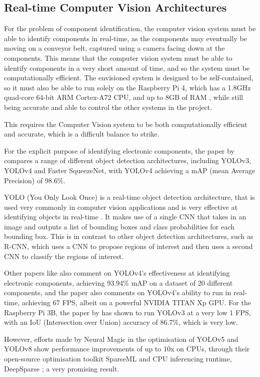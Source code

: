 \subsection{Real-time Computer Vision Architectures}
For the problem of component identification, the computer vision system must be able to identify components in real-time, as the components may eventually be moving on a conveyor belt, captured using
a camera facing down at the components. This means that the computer vision system must be able to identify components in a very short amount of time, and so the system must be computationally efficient.
The envisioned system is designed to be self-contained, so it must also be able to run solely on the Raspberry Pi 4, which has a 1.8GHz quad-core 64-bit ARM Cortex-A72 CPU, and up to 8GB of RAM \cite{pi4}, while still being
accurate and able to control the other systems in the project.

This requires the Computer Vision system to be both computationally efficient and accurate, which is a difficult balance to strike.

For the explicit purpose of identifying electronic components, the paper by \citet{s22239079} compares a range of different object detection architectures, including YOLOv3, YOLOv4 and Faster SqueezeNet, with YOLOv4 achieving a mAP (mean Average Precision) of 98.6\%.

YOLO (You Only Look Once) is a real-time object detection architecture, that is used very commonly in computer vision applications and is very effective at identifying objects in real-time \citet{yolo}. It makes
use of a single CNN that takes in an image and outputs a list of bounding boxes and class probabilities for each bounding box. This is in contrast to other object detection architectures, such as R-CNN, which uses a CNN to propose regions of interest and then uses a second CNN to classify the regions of interest.

Other papers like \citet{Guo2021} also comment on YOLOv4's effectiveness at identifying electronic components, achieving 93.94\% mAP on a dataset of 20 different components, and the paper also comments
on YOLOv4's ability to run in real-time, achieving 67 FPS, albeit on a powerful NVIDIA TITAN Xp GPU. For the Raspberry Pi 3B, the paper by \citet{9166199} has shown to run YOLOv3 at a very low 1 FPS,
with an IoU (Intersection over Union) accuracy of 86.7\%, which is very low. 

However, efforts made by Neural Magic \cite{neuralmagic} in the optimisation of YOLOv5 and YOLOv8 show performance improvements of up to 10x on CPUs, through their open-source 
optimisation toolkit SparseML \cite{sparseml} and CPU inferencing runtime, DeepSparse \cite{deepsparse}; a very promising result.

